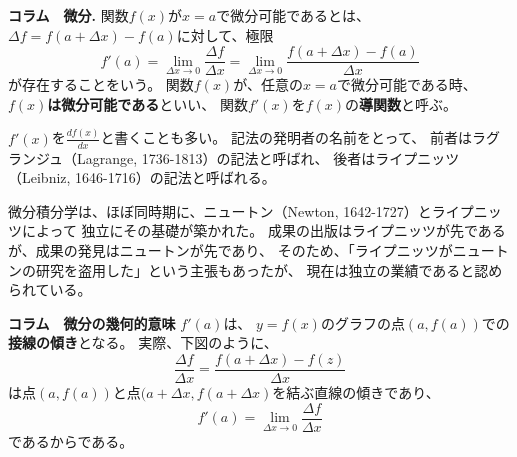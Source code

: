 \newpage
\begin{itembox}{\bf コラム　微分.}
  関数$f(x)$が$x = a$で微分可能であるとは、
  $\Delta f = f(a + \Delta x) - f(a)$に対して、極限
  \[
    f'(a) = \lim_{\Delta x\to 0}\frac{\Delta f}{\Delta x}
    = \lim_{\Delta x\to 0}\frac{f(a + \Delta x) - f(a)}{\Delta x}
  \]
  が存在することをいう。
  関数$f(x)$が、任意の$x = a$で微分可能である時、
  \textbf{$f(x)$は微分可能である}といい、
  関数$f'(x)$を$f(x)$の\textbf{導関数}と呼ぶ。

  $f'(x)$を$\displaystyle \frac{df(x)}{dx}$と書くことも多い。
  記法の発明者の名前をとって、
  前者はラグランジュ（Lagrange, 1736-1813）の記法と呼ばれ、
  後者はライプニッツ（Leibniz, 1646-1716）の記法と呼ばれる。

  微分積分学は、ほぼ同時期に、ニュートン（Newton, 1642-1727）とライプニッツによって
  独立にその基礎が築かれた。
  成果の出版はライプニッツが先であるが、成果の発見はニュートンが先であり、
  そのため、「ライプニッツがニュートンの研究を盗用した」という主張もあったが、
  現在は独立の業績であると認められている。
\end{itembox}

\begin{itembox}{\bf コラム　微分の幾何的意味}
$\displaystyle f'(a)$は、
$y = f(x)$のグラフの点$(a, f(a))$での\textbf{接線の傾き}となる。
実際、下図のように、
\[
  \frac{\Delta f}{\Delta x} = \frac{f(a+\Delta x) - f(z)}{\Delta x}
\]
は点$(a, f(a))$と点$(a+\Delta x, f(a+\Delta x)$を結ぶ直線の傾きであり、
\[
  f'(a) = \lim_{\Delta x\to 0}\frac{\Delta f}{\Delta x}
\]
であるからである。

\vspace{10mm}
\begin{center}
\end{center}
\end{itembox}

